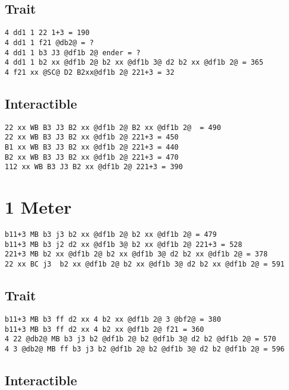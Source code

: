 \documentclass[main.tex]{subfiles}
\begin{document}
\subsection{Trait}

\begin{lstlisting}[language=FG]
4 dd1 1 22 1+3 = 190
4 dd1 1 f21 @db2@ = ?
4 dd1 1 b3 J3 @df1b 2@ ender = ?
4 dd1 1 b2 xx @df1b 2@ b2 xx @df1b 3@ d2 b2 xx @df1b 2@ = 365  
4 f21 xx @SC@ D2 B2xx@df1b 2@ 221+3 = 32
\end{lstlisting}


\subsection{Interactible}
\begin{lstlisting}[language=FG]
22 xx WB B3 J3 B2 xx @df1b 2@ B2 xx @df1b 2@  = 490
22 xx WB B3 J3 B2 xx @df1b 2@ 221+3 = 450
B1 xx WB B3 J3 B2 xx @df1b 2@ 221+3 = 440
B2 xx WB B3 J3 B2 xx @df1b 2@ 221+3 = 470
112 xx WB B3 J3 B2 xx @df1b 2@ 221+3 = 390
\end{lstlisting}

\section{1 Meter}


\begin{lstlisting}[language=FG]
b11+3 MB b3 j3 b2 xx @df1b 2@ b2 xx @df1b 2@ = 479
b11+3 MB b3 j2 d2 xx @df1b 3@ b2 xx @df1b 2@ 221+3 = 528
221+3 MB b2 xx @df1b 2@ b2 xx @df1b 3@ d2 b2 xx @df1b 2@ = 378
22 xx BC j3  b2 xx @df1b 2@ b2 xx @df1b 3@ d2 b2 xx @df1b 2@ = 591
\end{lstlisting}

\subsection{Trait}
\begin{lstlisting}[language=FG]
b11+3 MB b3 ff d2 xx 4 b2 xx @df1b 2@ 3 @bf2@ = 380
b11+3 MB b3 ff d2 xx 4 b2 xx @df1b 2@ f21 = 360
4 22 @db2@ MB b3 j3 b2 @df1b 2@ b2 @df1b 3@ d2 b2 @df1b 2@ = 570 
4 3 @db2@ MB ff b3 j3 b2 @df1b 2@ b2 @df1b 3@ d2 b2 @df1b 2@ = 596 
\end{lstlisting}


\subsection{Interactible}
\begin{lstlisting}[language=FG]

\end{lstlisting}
\end{document}
